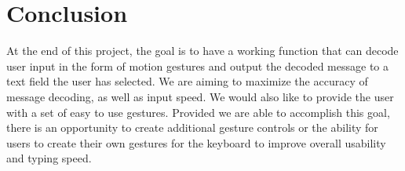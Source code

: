 \documentclass[onecolumn,draftclsnofoot,10pt, journal, letterpaper]{IEEEtran}
\begin{document}
\section{Conclusion}
At the end of this project, the goal is to have a working function that can decode user input in the form of motion gestures and output the decoded message to a text field the user has selected. We are aiming to maximize the accuracy of message decoding, as well as input speed. We would also like to provide the user with a set of easy to use gestures. Provided we are able to accomplish this goal, there is an opportunity to create additional gesture controls or the ability for users to create their own gestures for the keyboard to improve overall usability and typing speed.
\end{document}
